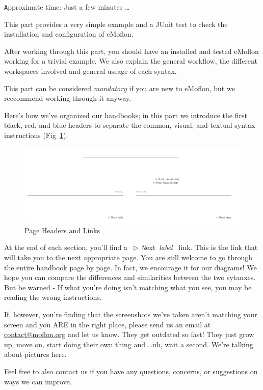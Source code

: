 \genHeader {} {\small \texttt Approximate time: Just a few minutes \ldots}

This part provides a very simple example and a JUnit test to check the installation and configuration of eMoflon.

After working through this part, you should have an installed and tested eMoflon working for a trivial example. We also explain the general workflow, the
different workspaces involved and general useage of each syntax.

This part can be considered \emph{mandatory} if you are new to eMoflon, but we reccommend working through it anyway.

Here's how we've organized our handbooks; in this part we introduce the first black, red, and blue headers to separate the common, visual, and textual syntax
instructions (Fig~\ref{pageExamples}).

\begin{figure}[htbp] \centering
  \includegraphics[width=1\textwidth]{pageExamples}
	\caption{Page Headers and Links} 
	\label{pageExamples} 
\end{figure}

At the end of each section, you'll find a \mbox{ $\triangleright$ {\texttt Next {\emph{label}}} } link. This is the link that will take you to the next
appropriate page. You are still welcome to go through the entire handbook page by page. In fact, we encourage it for our diagrams! We hope you can compare the
differences and similarities between the two sytanxes. But be warned - If what you're doing isn't matching what you see, you may be reading the wrong
instructions.

\pagebreak

If, however, you're finding that the screenshots we've taken aren't matching your screen and you ARE in the right place, please send us an email at
\href{mailto:contact@moflon.org}{contact@moflon.org} and let us know. They get outdated so fast! They just grow up, move on, start doing their own thing and
\ldots uh, wait a second. We're talking about pictures here.

Feel free to also contact us if you have any questions, concerns, or suggestions on ways we can improve.

\newpage